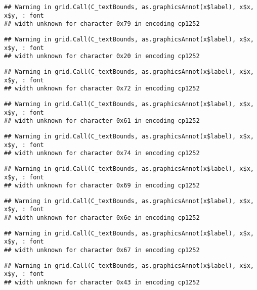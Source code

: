 \documentclass[
]{article}
\begin{document}
\begin{verbatim}
## Warning in grid.Call(C_textBounds, as.graphicsAnnot(x$label), x$x, x$y, : font
## width unknown for character 0x79 in encoding cp1252
\end{verbatim}

\begin{verbatim}
## Warning in grid.Call(C_textBounds, as.graphicsAnnot(x$label), x$x, x$y, : font
## width unknown for character 0x20 in encoding cp1252
\end{verbatim}

\begin{verbatim}
## Warning in grid.Call(C_textBounds, as.graphicsAnnot(x$label), x$x, x$y, : font
## width unknown for character 0x72 in encoding cp1252
\end{verbatim}

\begin{verbatim}
## Warning in grid.Call(C_textBounds, as.graphicsAnnot(x$label), x$x, x$y, : font
## width unknown for character 0x61 in encoding cp1252
\end{verbatim}

\begin{verbatim}
## Warning in grid.Call(C_textBounds, as.graphicsAnnot(x$label), x$x, x$y, : font
## width unknown for character 0x74 in encoding cp1252
\end{verbatim}

\begin{verbatim}
## Warning in grid.Call(C_textBounds, as.graphicsAnnot(x$label), x$x, x$y, : font
## width unknown for character 0x69 in encoding cp1252
\end{verbatim}

\begin{verbatim}
## Warning in grid.Call(C_textBounds, as.graphicsAnnot(x$label), x$x, x$y, : font
## width unknown for character 0x6e in encoding cp1252
\end{verbatim}

\begin{verbatim}
## Warning in grid.Call(C_textBounds, as.graphicsAnnot(x$label), x$x, x$y, : font
## width unknown for character 0x67 in encoding cp1252
\end{verbatim}

\begin{verbatim}
## Warning in grid.Call(C_textBounds, as.graphicsAnnot(x$label), x$x, x$y, : font
## width unknown for character 0x43 in encoding cp1252
\end{verbatim}
\end{document}
